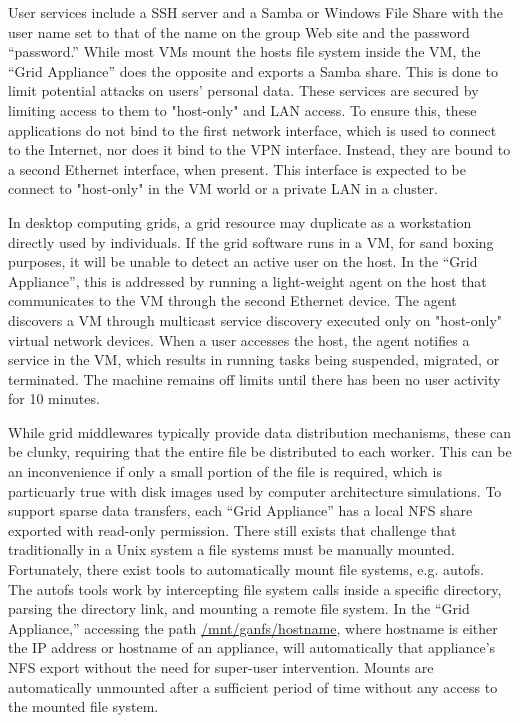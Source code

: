 \documentclass[conference]{IEEEtran}
\begin{document}
User services include a SSH server and a Samba or Windows File Share with the
user name set to that of the name on the group Web site and the password
``password.'' While most VMs mount the hosts file system inside the VM, the
``Grid Appliance'' does the opposite and exports a Samba share.  This is done
to limit potential attacks on users' personal data.  These services are secured
by limiting access to them to "host-only" and LAN access.  To ensure this,
these applications do not bind to the first network interface, which is used to
connect to the Internet, nor does it bind to the VPN interface.  Instead, they
are bound to a second Ethernet interface, when present.  This interface is
expected to be connect to "host-only" in the VM world or a private LAN in a
cluster.  

In desktop computing grids, a grid resource may duplicate as a workstation
directly used by individuals.  If the grid software runs in a VM, for sand
boxing purposes, it will be unable to detect an active user on the host.  In
the ``Grid Appliance'', this is addressed by running a light-weight agent on
the host that communicates to the VM through the second Ethernet device.  The
agent discovers a VM through multicast service discovery executed only on
"host-only" virtual network devices.  When a user accesses the host, the agent
notifies a service in the VM, which results in running tasks being suspended,
migrated, or terminated.  The machine remains off limits until there has been
no user activity for 10 minutes.

While grid middlewares typically provide data distribution mechanisms, these
can be clunky, requiring that the entire file be distributed to each worker.
This can be an inconvenience if only a small portion of the file is required,
which is particuarly true with disk images used by computer architecture
simulations.  To support sparse data transfers, each ``Grid Appliance'' has a
local NFS share exported with read-only permission.  There still exists that
challenge that traditionally in a Unix system a file systems must be manually
mounted.  Fortunately, there exist tools to automatically mount file systems,
e.g.  autofs. The autofs tools work by intercepting file system calls inside a
specific directory, parsing the directory link, and mounting a remote file
system.  In the ``Grid Appliance,'' accessing the path
\url{/mnt/ganfs/hostname}, where hostname is either the IP address or hostname
of an appliance, will automatically that appliance's NFS export without the
need for super-user intervention.  Mounts are automatically unmounted after a
sufficient period of time without any access to the mounted file system.  
\end{document}
